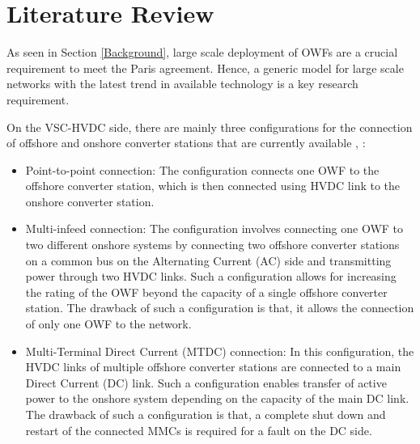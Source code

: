 \section{Literature Review}

As seen in Section \ref{Background}, large scale deployment of \gls{OWF}s are a crucial requirement to meet the Paris agreement. Hence, a generic model for large scale networks with the latest trend in available technology is a key research requirement. 


On the \gls{VSC}-\gls{HVDC} side, there are mainly three configurations for the connection of offshore and onshore converter stations that are currently available \cite{cigre_B455}, \cite{sharifabadi2016design}: 
\begin{itemize}
    \item Point-to-point connection: The configuration connects one \gls{OWF} to the offshore converter station, which is then connected using \gls{HVDC} link to the onshore converter station.
    \item Multi-infeed connection: The configuration involves connecting one \gls{OWF} to two different onshore systems by connecting two offshore converter stations on a common bus on the Alternating Current (\gls{AC}) side and transmitting power through two \gls{HVDC} links. Such a configuration allows for increasing the rating of the \gls{OWF} beyond the capacity of a single offshore converter station. The drawback of such a configuration is that, it allows the connection of only one \gls{OWF} to the network.
    \item Multi-Terminal Direct
    Current (MTDC) connection: In this configuration, the \gls{HVDC} links of multiple offshore converter stations are connected to a main Direct Current (\gls{DC}) link. Such a configuration enables transfer of active power to the onshore system depending on the capacity of the main \gls{DC} link. The drawback of such a configuration is that, a complete shut down and restart of the connected \gls{MMC}s is required for a fault on the \gls{DC} side.
\end{itemize}

